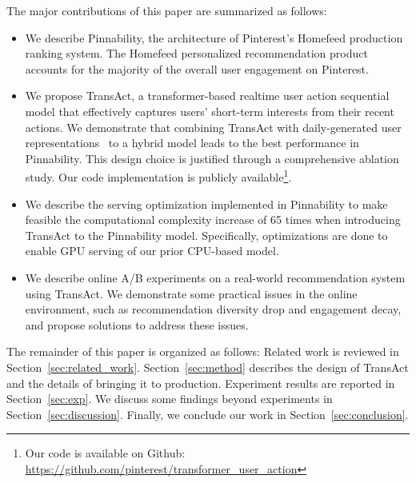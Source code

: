 The major contributions of this paper are summarized as follows:
\begin{itemize}
 \item We describe Pinnability, the architecture of Pinterest's Homefeed production ranking system. The Homefeed personalized recommendation product accounts for the majority of the overall user engagement on Pinterest. 

 \item  We propose TransAct, a transformer-based realtime user action sequential model that effectively captures users' short-term interests from their recent actions. We demonstrate that combining TransAct with daily-generated user representations~\cite{pinnerformer} to a hybrid model leads to the best performance in Pinnability. This design choice is justified through a comprehensive ablation study. Our code implementation is publicly available\footnote{Our code is available on Github: \url{https://github.com/pinterest/transformer_user_action}}.

\item We describe the serving optimization implemented in Pinnability to make feasible the computational complexity increase of 65 times when introducing TransAct to the Pinnability model. Specifically, optimizations are done to enable GPU serving of our prior CPU-based model.
\item We describe online A/B experiments on a real-world recommendation system using TransAct. We demonstrate some practical issues in the online environment, such as recommendation diversity drop and engagement decay, and propose solutions to address these issues.  

\end{itemize}

The remainder of this paper is organized as follows: Related
work is reviewed in Section~\ref{sec:related_work}. Section~\ref{sec:method} describes the design of TransAct and the details of bringing it to production. Experiment results are reported in Section~\ref{sec:exp}. We discuss some findings beyond experiments in Section~\ref{sec:discussion}. Finally, we conclude our work in Section~\ref{sec:conclusion}.









